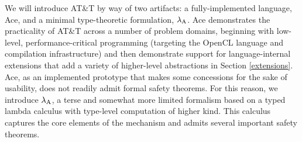\documentclass[10pt]{sigplanconf}
\begin{document}
We will introduce AT\&T by way of two artifacts: a fully-implemented language, Ace, and a minimal type-theoretic formulation, $\lambda_{\text{A}}$. Ace demonstrates the practicality of AT\&T across a number of problem domains, beginning with low-level, performance-critical programming (targeting the OpenCL language and compilation infrastructure) and then demonstrate support for language-internal extensions that add a variety of higher-level  abstractions in Section \ref{extensions}. Ace, as an implemented prototype that makes some concessions for the sake of usability, does not readily admit formal safety theorems. For this reason, we introduce $\lambda_{\text{A}}$, a terse and somewhat more limited formalism based on a typed lambda calculus with type-level computation of higher kind. This calculus captures the core elements of the   mechanism and admits several important safety theorems.



%
\end{document}

